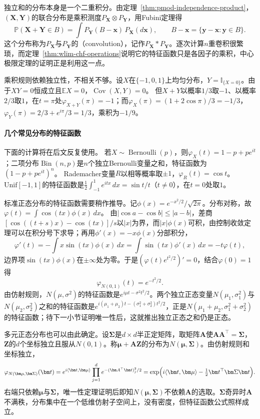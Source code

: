 独立和的分布本身是一个二重积分。由定理~\ref{thm:pmod-independence-product}，$(\bm X,\bm Y)$的联合分布是乘积测度$P_{\bm X}\otimes P_{\bm Y}$，用Fubini定理得
\[
  \mathbb P(\bm X+\bm Y\in B)=\int P_{\bm Y}(B-\bm x)\,P_{\bm X}(d\bm x),\qquad B-\bm x=\{\bm y-\bm x:\bm y\in B\}.
\]
这个分布称为$P_{\bm X}$与$P_{\bm Y}$的（convolution），记作$P_{\bm X}*P_{\bm Y}$。逐次计算$n$重卷积很繁琐，而定理~\ref{thm:wlim-chf-operations}说明它的特征函数只是各因子的乘积，中心极限定理的证明正是利用这一点。

乘积规则依赖独立性，不相关不够。设$X$在$\{-1,0,1\}$上均匀分布，$Y=\mathbb I_{\{X=0\}}$。由于$XY=0$恒成立且$\mathbb E X=0$，$\operatorname{Cov}(X,Y)=0$。
但$X+Y$以概率$1/3$取$-1$、以概率$2/3$取$1$，在$t=\pi$处$\varphi_{X+Y}(\pi)=-1$；而$\varphi_X(\pi)=(1+2\cos\pi)/3=-1/3$，$\varphi_Y(\pi)=2/3+e^{i\pi}/3=1/3$，乘积为$-1/9$。

\paragraph{几个常见分布的特征函数}
下面的计算将在后文反复使用。
若$X\sim\operatorname{Bernoulli}(p)$，则$\varphi_X(t)=1-p+pe^{it}$；二项分布$\operatorname{Bin}(n,p)$是$n$个独立Bernoulli变量之和，特征函数为$(1-p+pe^{it})^n$。
Rademacher变量$R$以相等概率取$\pm1$，$\varphi_R(t)=\cos t$。$\mathrm{Unif}[-1,1]$的特征函数是$\frac12\int_{-1}^1e^{itx}\,dx=\sin t/t$（$t\ne0$），在$t=0$处取$1$。

标准正态分布的特征函数需要稍作推导。记$\phi(x)=e^{-x^2/2}/\sqrt{2\pi}$。分布对称，故$\varphi(t)=\int\cos(tx)\phi(x)\,dx$。
由$|\cos a-\cos b|\leq|a-b|$，差商$[\cos((t+s)x)-\cos(tx)]/s$以$|x|$为界，而$|x|\phi(x)$可积，由控制收敛定理可以在积分号下求导；再用$\phi'(x)=-x\phi(x)$分部积分，
\[
  \varphi'(t)=-\int x\sin(tx)\phi(x)\,dx=\int\sin(tx)\phi'(x)\,dx=-t\varphi(t),
\]
边界项$\sin(tx)\phi(x)$在$\pm\infty$处为零。于是$(\varphi(t)e^{t^2/2})'=0$，结合$\varphi(0)=1$得
\begin{equation}
  \varphi_{N(0,1)}(t)=e^{-t^2/2}.
  \label{eq:wlim-normal-chf}
\end{equation}
由仿射规则，$N(\mu,\sigma^2)$的特征函数是$e^{i\mu t-\sigma^2t^2/2}$。两个独立正态变量$N(\mu_1,\sigma_1^2)$与$N(\mu_2,\sigma_2^2)$之和的特征函数是$e^{i(\mu_1+\mu_2)t-(\sigma_1^2+\sigma_2^2)t^2/2}$，正是$N(\mu_1+\mu_2,\sigma_1^2+\sigma_2^2)$的特征函数；待下一小节证明唯一性后，这就推出独立正态之和仍是正态。

多元正态分布也可以由此确定。设$\bm\Sigma$是$d\times d$半正定矩阵，取矩阵$\bm A$使$\bm A\bm A^\top=\bm\Sigma$，$\bm Z$的$d$个坐标独立且服从$N(0,1)$。称$\bm\mu+\bm A\bm Z$的分布为$N(\bm\mu,\bm\Sigma)$。由仿射规则和坐标独立，
\begin{equation}
  \varphi_{N(\bm\mu,\bm\Sigma)}(\bm t)=e^{i\langle\bm t,\bm\mu\rangle}\prod_{j=1}^de^{-(\bm A^\top\bm t)_j^2/2}=\exp\Bigl(i\langle\bm t,\bm\mu\rangle-\tfrac12\bm t^\top\bm\Sigma\bm t\Bigr).
  \label{eq:wlim-mvn-chf}
\end{equation}
右端只依赖$\bm\mu$与$\bm\Sigma$，唯一性定理证明后即知$N(\bm\mu,\bm\Sigma)$不依赖$\bm A$的选取。$\bm\Sigma$奇异时$\bm A$不满秩，分布集中在一个低维仿射子空间上，没有密度，但特征函数公式照样成立。

